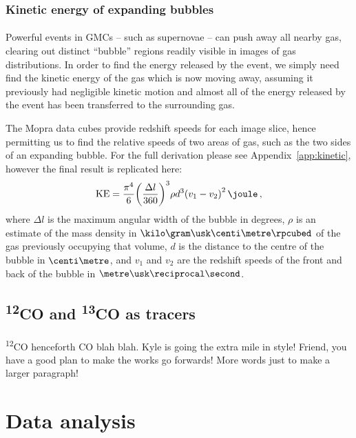 \documentclass[a4paper, titlepage, oneside]{article}
\newcommand{\elem}[2]{\textsuperscript{#1}{#2}}
\begin{document}
\begin{multicols}{2}
\subsubsection{Kinetic energy of expanding bubbles}
\label{sec:kinetic}
\paragraph{}
Powerful events in GMCs -- such as supernovae -- can push away all nearby gas, clearing out distinct ``bubble'' regions readily visible in images of gas distributions. In order to find the energy released by the event, we simply need find the kinetic energy of the gas which is now moving away, assuming it previously had negligible kinetic motion and almost all of the energy released by the event has been transferred to the surrounding gas.

The Mopra data cubes provide redshift speeds for each image slice, hence permitting us to find the relative speeds of two areas of gas, such as the two sides of an expanding bubble. For the full derivation please see Appendix~\ref{app:kinetic}, however the final result is replicated here:
\begin{equation}
  \mathrm{KE} = \frac{\pi ^ 4}{6} {\left( \frac{\Delta l}{360} \right)}^3 \rho d^3 {(v_1 - v_2)}^2 \, \joule \, ,
\end{equation}
where \(\Delta l\) is the maximum angular width of the bubble in degrees, \(\rho\) is an estimate of the mass density in \(\kilo\gram\usk\centi\metre\rpcubed\) of the gas previously occupying that volume, \(d\) is the distance to the centre of the bubble in \(\centi\metre\), and \(v_1\) and \(v_2\) are the redshift speeds of the front and back of the bubble in \(\metre\usk\reciprocal\second\).

\subsection{\elem{12}{CO} and \elem{13}{CO} as tracers}
\label{sec:co}
\paragraph{}
\elem{12}{CO} henceforth CO blah blah. Kyle is going the extra mile in style! Friend, you have a good plan to make the works go forwards! More words just to make a larger paragraph!

\section{Data analysis}

\end{multicols}
\end{document}
